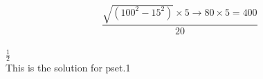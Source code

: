 \documentclass{article}
\begin{document}
\center
\[
\frac{\sqrt{(100^2-15^2)} \times 5 \rightarrow 80 \times 5 = 400}{20}
\]
\\ \(\frac 1 2\)
\\This is the solution for pset.1 
\end{document}
